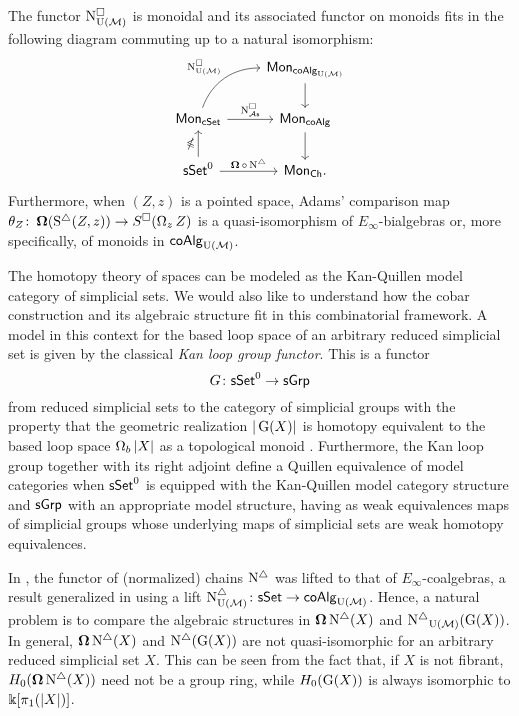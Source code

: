 \begin{theorem} \label{t:1st main thm in the intro}
	The functor $\operatorname{N^{\square}_{{\operatorname{U}(\mathcal{M})}}}$ is monoidal and its associated functor on monoids fits in the following diagram commuting up to a natural isomorphism:
	\[
	\begin{tikzcd}
	& \Mon_{\coAlg_\UM} \arrow[d] \\
	\Mon_{\cSet} \arrow[ru, "\cchainsUM", out=70, in=180] \arrow[r, "\cchainsAS"]
	& \Mon_{\coAlg} \arrow[d] \\
	\sSet^0 \arrow[r, "\cobar \circ \schains"] \arrow[u, "\ccobar"]
	& \Mon_{\Ch}.
	\end{tikzcd}
	\]
	Furthermore, when $(Z, z)$ is a pointed space, Adams' comparison map $\theta_Z \colon \operatorname{\mathbf{\Omega}}(\operatorname{S^{\triangle}}(Z, z)) \to S^{\square}(\operatorname{\Omega}_z Z)$ is a quasi-isomorphism of $E_{\infty}$-bialgebras or, more specifically, of monoids in $\mathsf{coAlg}_{\operatorname{U}(\mathcal{M})}$.
\end{theorem} 
The homotopy theory of spaces can be modeled as the Kan-Quillen model category of simplicial sets.
We would also like to understand how the cobar construction and its algebraic structure fit in this combinatorial framework.
A model in this context for the based loop space of an arbitrary reduced simplicial set is given by the classical \textit{Kan loop group functor}.
This is a functor 
\[
G\colon \mathsf{sSet}^0 \to \mathsf{sGrp}
\]
from reduced simplicial sets to the category of simplicial groups with the property that the geometric realization $|\operatorname{G}(X)|$ is homotopy equivalent to the based loop space $\operatorname{\Omega}_b|X|$ as a topological monoid \cite{berger1995loops}.
Furthermore, the Kan loop group together with its right adjoint define a Quillen equivalence of model categories when $\mathsf{sSet}^0$ is equipped with the Kan-Quillen model category structure and $\mathsf{sGrp}$ with an appropriate model structure, having as weak equivalences maps of simplicial groups whose underlying maps of simplicial sets are weak homotopy equivalences.

In \cite{mcclure2003multivariable, berger2004combinatorial}, the functor of (normalized) chains $\operatorname{N^{\triangle}}$ was lifted to that of $E_{\infty}$-coalgebras, a result generalized in \cite{medina2020prop1} using a lift $\operatorname{N^{\triangle}_{{\operatorname{U}(\mathcal{M})}}} \colon \mathsf{sSet} \to \mathsf{coAlg}_{{\operatorname{U}(\mathcal{M})}}$.
Hence, a natural problem is to compare the algebraic structures in $\operatorname{\mathbf{\Omega}} \operatorname{N^{\triangle}}(X)$ and $\operatorname{N^{\triangle}}_{{\operatorname{U}(\mathcal{M})}}(\operatorname{G}(X))$.
In general, $\operatorname{\mathbf{\Omega}} \operatorname{N^{\triangle}}(X)$ and $\operatorname{N^{\triangle}}(\operatorname{G}(X))$ are not quasi-isomorphic for an arbitrary reduced simplicial set $X$.
This can be seen from the fact that, if $X$ is not fibrant, $H_0(\operatorname{\mathbf{\Omega}} \operatorname{N^{\triangle}}(X))$ need not be a group ring, while $H_0(\operatorname{G}(X))$ is always isomorphic to $ \Bbbk[\pi_1(|X|)]$.

